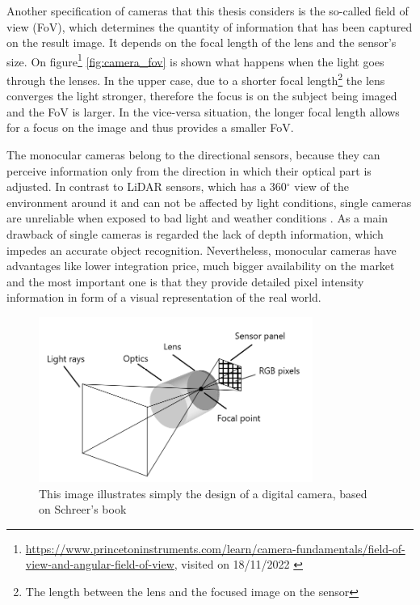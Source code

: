 Another specification of cameras that this thesis considers is the so-called field of view (FoV), which determines the quantity of information that has been captured on the result image. It depends on the focal length of the lens and the sensor's size. On figure\footnote{\url{https://www.princetoninstruments.com/learn/camera-fundamentals/field-of-view-and-angular-field-of-view}, visited on 18/11/2022 \label{fov_figure}} \ref{fig:camera_fov} is shown what happens when the light goes through the lenses. In the upper case, due to a shorter focal length\footnote{The length between the lens and the focused image on the sensor} the lens converges the light stronger, therefore the focus is on the subject being imaged and the FoV is larger. In the vice-versa situation, the longer focal length allows for a focus on the image and thus provides a smaller FoV.

The monocular cameras belong to the directional sensors, because they can perceive information only from the direction in which their optical part is adjusted. In contrast to LiDAR sensors, which has a 360$^{\circ}$ view of the environment around it and can not be affected by light
conditions, single cameras are unreliable when exposed to bad light and weather conditions \cite{camera_vs_lidar}. As a main drawback of single cameras is regarded the lack of depth information, which impedes an accurate object recognition. Nevertheless, monocular cameras have advantages like lower integration price, much bigger availability on the market and the most important one is that they provide detailed pixel intensity information in form of a visual representation of the real world.
\begin{figure}
\centering
\includegraphics[width=0.8\textwidth]{images/camera_construction.png}
\caption[Digital camera's design]{This image illustrates simply the design of a digital camera, based on Schreer's book \cite{camera_pinhole_model} \label{fig:camera_construction}}
\end{figure}

